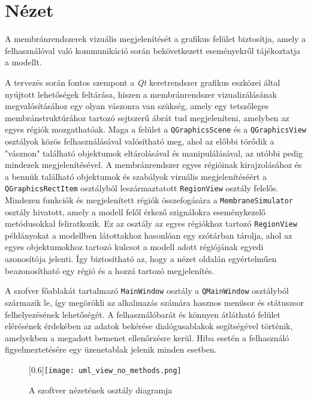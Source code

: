 \section{Nézet}

A membránrendszerek vizuális megjelenítését a grafikus felület biztosítja, amely a felhasználóval való kommunikáció 
során bekövetkezett eseményekről tájékoztatja a modellt.

A tervezés során fontos szempont a \textit{Qt} keretrendszer grafikus eszközei által nyújtott lehetőségek feltárása, hiszen a membránrendszer vizualizálásának megvalósításához egy olyan vászonra van szükség, amely egy tetszőleges membránstruktúrához tartozó sejtszerű ábrát tud megjeleníteni, amelyben az egyes régiók mozgathatóak. Maga a felület a \verb|QGraphicsScene| és a \verb|QGraphicsView| osztályok közös felhasználásával valósítható meg, ahol az előbbi törődik a "vásznon" található objektumok eltárolásával és manipulálásával, az utóbbi pedig mindezek megjelenítésével. 
A membránrendszer egyes régióinak kirajzolásához és a bennük található objektumok és szabályok vizuális megjelenítéséért a \verb|QGraphicsRectItem| osztályból leszármaztatott \verb|RegionView| osztály felelős. Mindezen funkciók és megjelenített régiók összefogására a \verb|MembraneSimulator| osztály hivatott, amely a modell felől érkező szignálokra eseménykezelő metódusokkal feliratkozik. Ez az osztály az egyes régiókhoz tartozó \verb|RegionView| példányokat a modellben látottakhoz hasonlóan egy szótárban tárolja, ahol az egyes objektumokhoz tartozó kulcsot a modell adott régiójának egyedi azonosítója jelenti. Így biztosítható az, hogy a nézet oldalán egyértelműen beazonosítható egy régió és a hozzá tartozó megjelenítés. 

A szofver főablakát tartalmazó \verb|MainWindow| osztály a \verb|QMainWindow| osztályból származik le, így megörökli az alkalmazás számára hasznos menüsor és státuszsor felhelyezésének lehetőségét. A felhasználóbarát és könnyen átlátható felület elérésének érdekében az adatok bekérése dialógusablakok segítségével történik, amelyekben a megadott bemenet ellenőrzésre kerül. Hiba esetén a felhasználó figyelmeztetésére egy üzenetablak jelenik minden esetben.

\begin{figure}[H]
\advance\leftskip-3cm
	\scalebox{0.6}[0.6]{\texttt{[image: uml\_view\_no\_methods.png]}}
	\caption{A szoftver nézetének osztály diagramja}
	\label{fig:save_model_base}
\end{figure}

